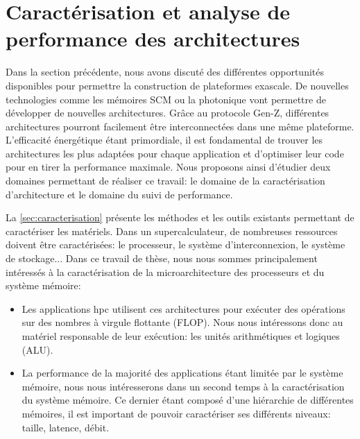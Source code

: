 \section{Caractérisation et analyse de performance des architectures}
\label{chap:performance} \label{sec:edl_perf_intro}

    Dans la section précédente, nous avons discuté des différentes opportunités disponibles pour permettre la construction de plateformes \gls{exascale}. De nouvelles technologies comme les mémoires SCM ou la photonique vont permettre de développer de nouvelles architectures. Grâce au protocole Gen-Z, différentes architectures pourront facilement être interconnectées dans une même plateforme. L'efficacité énergétique étant primordiale, il est fondamental de trouver les architectures les plus adaptées pour chaque application et d'optimiser leur code pour en tirer la performance maximale. Nous proposons ainsi d'étudier deux domaines permettant de réaliser ce travail: le domaine de la caractérisation d'architecture et le domaine du suivi de performance. 
    
    La \autoref{sec:caracterisation} présente les méthodes et les outils existants permettant de caractériser les matériels. Dans un supercalculateur, de nombreuses ressources doivent être caractérisées: le processeur, le système d'interconnexion, le système de stockage... 
    Dans ce travail de thèse, nous nous sommes principalement intéressés à la caractérisation de la microarchitecture des processeurs et du système mémoire:
    \begin{itemize}
        \item Les applications \gls{hpc} utilisent ces architectures pour exécuter des opérations sur des nombres à virgule flottante (\gls{FLOP}). Nous nous intéressons donc au matériel responsable de leur exécution: les unités arithmétiques et logiques (ALU).
        
        \item La performance de la majorité des applications étant limitée par le système mémoire, nous nous intéresserons dans un second temps à la caractérisation du système mémoire. Ce dernier étant composé d'une hiérarchie de différentes mémoires, il est important de pouvoir caractériser ses différents niveaux: taille, latence, débit.
    \end{itemize}
    
